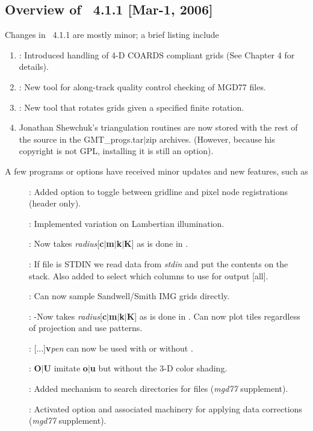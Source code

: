 
\subsection{Overview of \gmt\ 4.1.1 [Mar-1, 2006]}

Changes in \GMT\ 4.1.1 are mostly minor; a brief listing include

\begin{enumerate}
\item {}: Introduced handling of 4-D COARDS compliant grids (See Chapter 4 for details).
\item {}: New tool for along-track quality control checking of MGD77 files.
\item {}: New tool that rotates grids given a specified finite rotation.
\item Jonathan Shewchuk's triangulation routines are now stored with the rest of the source in the GMT\_progs.tar$|$zip archives.
(However, because his copyright is not GPL, installing it is still an option).
\end{enumerate}

A few programs or options have received minor updates and new features, such as

\begin{description}
\item []: Added option  to toggle between gridline and pixel node registrations (header only).
\item []: Implemented variation on Lambertian illumination.
\item []: Now takes \emph{radius}[\textbf{c$|$m$|$k$|$K}] as is done in .
\item []: If file is STDIN we read data from \emph{stdin} and put the contents on the stack.
Also added  to select which columns to use for output [all].
\item []: Can now sample Sandwell/Smith IMG grids directly.
\item []: -Now takes \emph{radius}[\textbf{c$|$m$|$k$|$K}] as is done in .
Can now plot tiles regardless of projection and use patterns.
\item []: [...]\textbf{v}\emph{pen} can now be used with or without .
\item []: \textbf{O}$|$\textbf{U} imitate \textbf{o}$|$\textbf{u} but without the 3-D color shading.
\item []: Added mechanism to search directories for files (\emph{mgd77} supplement).
\item []: Activated  option and associated machinery for applying data corrections
(\emph{mgd77} supplement).
\end{description}

